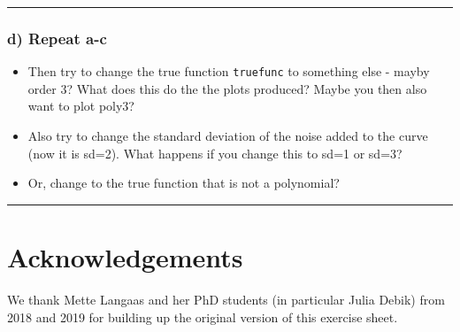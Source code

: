 \documentclass[]{article}
\providecommand{\tightlist}{%
  \setlength{\itemsep}{0pt}\setlength{\parskip}{0pt}}
\begin{document}
\begin{center}\rule{0.5\linewidth}{\linethickness}\end{center}

\subsubsection{d) Repeat a-c}\label{d-repeat-a-c}

\begin{itemize}
\tightlist
\item
  Then try to change the true function \texttt{truefunc} to something
  else - mayby order 3? What does this do the the plots produced? Maybe
  you then also want to plot poly3?
\item
  Also try to change the standard deviation of the noise added to the
  curve (now it is sd=2). What happens if you change this to sd=1 or
  sd=3?
\item
  Or, change to the true function that is not a polynomial?
\end{itemize}

\begin{center}\rule{0.5\linewidth}{\linethickness}\end{center}

\section{Acknowledgements}\label{acknowledgements}

We thank Mette Langaas and her PhD students (in particular Julia Debik)
from 2018 and 2019 for building up the original version of this exercise
sheet.
\end{document}
